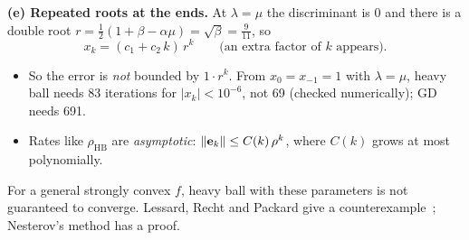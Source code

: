 \begin{frame}{}
  \textbf{(e) Repeated roots at the ends.} At $\lambda = \mu$ the discriminant is $0$ and there is a double root
  $r = \tfrac12(1+\beta-\alpha\mu) = \sqrt\beta = \tfrac9{11}$, so
  \[
    x_k = (c_1 + c_2\,k)\,r^k \qquad\text{(an extra factor of $k$ appears).}
  \]
  \begin{itemize}\small
    \item So the error is \emph{not} bounded by $1\cdot r^k$. From $x_0 = x_{-1} = 1$ with $\lambda = \mu$,
          heavy ball needs \alert{83} iterations for $|x_k|<10^{-6}$, not 69 (checked numerically); GD needs 691.
    \item Rates like $\rho_{\text{HB}}$ are \emph{asymptotic}: $\left\lVert \mathbf{e}_k \right\rVert\le C(k)\,\rho^k$, where $C(k)$ grows at most polynomially.
  \end{itemize}
  \begin{warnbox}
    For a general strongly convex $f$, heavy ball with these parameters is not guaranteed to converge.
    Lessard, Recht and Packard give a counterexample~\cite{lessard2016}; Nesterov's method has a proof.
  \end{warnbox}
\end{frame}
